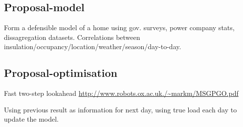 \documentclass[11pt]{article}
\begin{document}
\subsection{Proposal-model}
Form a defensible model of a home using gov. surveys, power company stats, dissagregation datasets. Correlations between insulation/occupancy/location/weather/season/day-to-day.
\subsection{Proposal-optimisation}
Fast two-step lookahead \url{http://www.robots.ox.ac.uk./~markm/MSGPGO.pdf}

Using previous result as information for next day, using true load each day to update the model.
\end{document}
